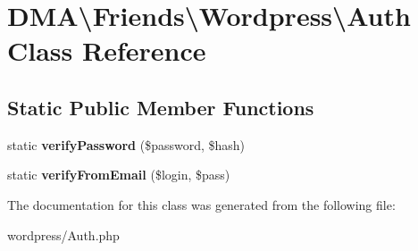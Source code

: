 \hypertarget{classDMA_1_1Friends_1_1Wordpress_1_1Auth}{\section{D\+M\+A\textbackslash{}Friends\textbackslash{}Wordpress\textbackslash{}Auth Class Reference}
\label{classDMA_1_1Friends_1_1Wordpress_1_1Auth}
}
\subsection*{Static Public Member Functions}
\begin{DoxyCompactItemize}
\item 
\hypertarget{classDMA_1_1Friends_1_1Wordpress_1_1Auth_a63c8f99cb053154bf734abed9bfc95e4}{static {\bfseries verify\+Password} (\$password, \$hash)}\label{classDMA_1_1Friends_1_1Wordpress_1_1Auth_a63c8f99cb053154bf734abed9bfc95e4}

\item 
\hypertarget{classDMA_1_1Friends_1_1Wordpress_1_1Auth_abc193d80d0a0ba3303d4efcbb3c4376c}{static {\bfseries verify\+From\+Email} (\$login, \$pass)}\label{classDMA_1_1Friends_1_1Wordpress_1_1Auth_abc193d80d0a0ba3303d4efcbb3c4376c}

\end{DoxyCompactItemize}


The documentation for this class was generated from the following file\+:\begin{DoxyCompactItemize}
\item 
wordpress/Auth.\+php\end{DoxyCompactItemize}
